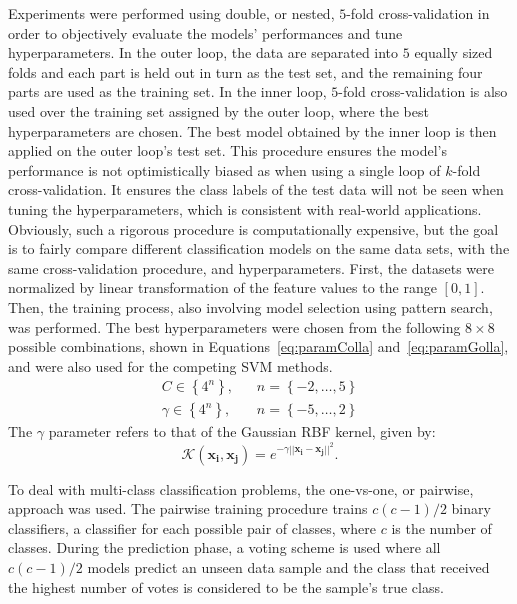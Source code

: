 \documentclass[reqno]{vcuthesis}
\newcommand{\set}[1]{{\left\{#1\right\}}}
\newcommand{\norm}[1]{{||#1||}}
\numberwithin{equation}{chapter}
\begin{document}
Experiments were performed using double, or nested, $5$-fold cross-validation in order to objectively evaluate the models' performances and tune hyperparameters. In the outer loop, the data are separated into $5$ equally sized folds and each part is held out in turn as the test set, and the remaining four parts are used as the training set. In the inner loop, $5$-fold cross-validation is also used over the training set assigned by the outer loop, where the best hyperparameters are chosen. The best model obtained by the inner loop is then applied on the outer loop's test set. This procedure ensures the model's performance is not optimistically biased as when using a single loop of $k$-fold cross-validation. It ensures the class labels of the test data will not be seen when tuning the hyperparameters, which is consistent with real-world applications. Obviously, such a rigorous procedure is computationally expensive, but the goal is to fairly compare different classification models on the same data sets, with the same cross-validation procedure, and hyperparameters. First, the datasets were normalized by linear transformation of the feature values to the range $[0,1]$. Then, the training process, also involving model selection using pattern search, was performed. The best hyperparameters were chosen from the following $8 \times 8$ possible combinations, shown in Equations~\eqref{eq:paramColla} and~\eqref{eq:paramGolla}, and were also used for the competing SVM methods.
\begin{subequations}
\label{eq:hyperparamolla}
\begin{align}
C \in \set{4^n}, & \,\,\,\,\,n = \set{-2, \ldots, 5} \label{eq:paramColla}\\
\gamma \in \set{4^n},  & \,\,\,\,\,n = \set{-5, \ldots, 2} \label{eq:paramGolla}
\end{align}
\end{subequations}
The $\gamma$ parameter refers to that of the Gaussian RBF kernel, given by:
\begin{equation}
\label{eq:rbf}
\mathcal{K}(\bm{x_i},\bm{x_j}) = e^{-\gamma\norm{\bm{x_i} - \bm{x_j}}^2}.
\end{equation}

To deal with multi-class classification problems, the one-vs-one, or pairwise, approach was used. The pairwise training procedure trains $c(c - 1)/2$ binary classifiers, a classifier for each possible pair of classes, where $c$ is the number of classes. During the prediction phase, a voting scheme is used where all $c(c - 1)/2$ models predict an unseen data sample and the class that received the highest number of votes is considered to be the sample’s true class.
\end{document}
